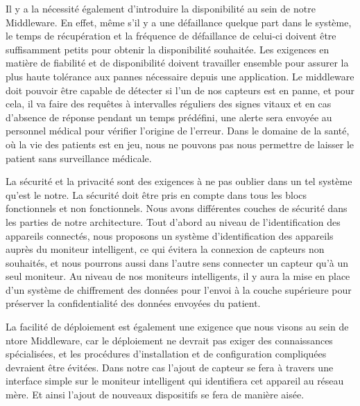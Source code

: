 Il y a la nécessité également d'introduire la disponibilité au sein de notre Middleware. En effet, même s'il y a une défaillance quelque part dans le système, le temps de récupération et la fréquence de défaillance de celui-ci doivent être suffisamment petits pour obtenir la disponibilité souhaitée. Les exigences en matière de fiabilité et de disponibilité doivent travailler ensemble pour assurer la plus haute tolérance aux pannes nécessaire depuis une application. Le middleware doit pouvoir être capable de détecter si l’un de nos capteurs est en panne, et pour cela, il va faire des requêtes à intervalles réguliers des signes vitaux et en cas d’absence de réponse pendant un temps prédéfini, une alerte sera envoyée au personnel médical pour vérifier l’origine de l’erreur. Dans le domaine de la santé, où la vie des patients est en jeu, nous ne pouvons pas nous permettre de laisser le patient sans surveillance médicale.

La sécurité et la privacité sont des exigences à ne pas oublier dans un tel système qu'est le notre. La sécurité doit être pris en compte dans tous les blocs fonctionnels et non fonctionnels. Nous avons différentes couches de sécurité dans les parties de notre architecture. Tout d’abord au niveau de l’identification des appareils connectés, nous proposons un système d’identification des appareils auprès du moniteur intelligent, ce qui évitera la connexion de capteurs non souhaités, et nous pourrons aussi dans l’autre sens connecter un capteur qu’à un seul moniteur. Au niveau de nos moniteurs intelligents, il y aura la mise en place d’un système de chiffrement des données pour l’envoi à la couche supérieure pour préserver la confidentialité des données envoyées du patient.

La facilité de déploiement est également une exigence que nous visons au sein de ntore Middleware, car le déploiement ne devrait pas exiger des connaissances spécialisées, et les procédures d'installation et de configuration compliquées devraient être évitées. Dans notre cas l’ajout de capteur se fera à travers une interface simple sur le moniteur intelligent qui identifiera cet appareil au réseau mère. Et ainsi l’ajout de nouveaux dispositifs se fera de manière aisée.